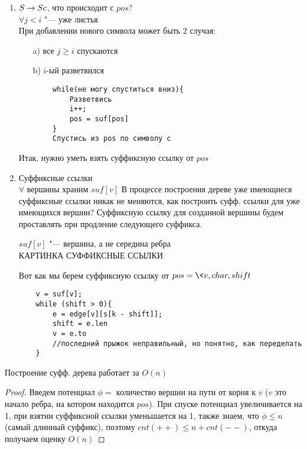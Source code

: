 \begin{enumerate}
\begin{proof}
		КАРТИНКА ДОКАЗАТЕЛЬСТВА ЛЕММЫ
	\end{proof}
	Таким образом, надо поддерживать самый длинный неразретвившийся суффикс, будем хранить его в переменной $pos$, как комбинацию вершины дерева, символа по которому надо пойти и сдвига на ребре ($pos$ может быть на середине ребра), $i$ "--- позиция начала суффикса
\item
	$ S \rightarrow Sc $, что происходит с $pos$? \\
	$\forall j < i$ "--- уже листья \\
	При добавлении нового символа может быть 2 случая:
	\begin{itemize}
	\item[a)]
		все $j \geqslant i$ спускаются
	\item[b)]
		$i$-ый разветвился
	\end{itemize}
	\begin{verbatim}
		while(не могу спуститься вниз){
			Разветвись
			i++;
			pos = suf[pos]
		}
		Спустись из pos по символу c
	\end{verbatim}
	Итак, нужно уметь взять суффиксную ссылку от $pos$
\item
	Суффиксные ссылки \\
	$\forall$ вершины храним $suf[v]$
	В процессе построения дереве уже имеющиеся суффиксные ссылки никак не меняются, как построить суфф. ссылки для уже имеющихся вершин? Суффиксную ссылку для созданной вершины будем проставлять при продление следующего суффикса.
	\begin{lemma}
		$suf[v]$ "--- вершина, а не середина ребра \\
		КАРТИНКА СУФФИКСНЫЕ ССЫЛКИ
	\end{lemma}
	Вот как мы берем суффиксную ссылку от $pos = \<v, char, shift\>$
	\begin{verbatim}
	v = suf[v];
	while (shift > 0){
		e = edge[v][s[k - shift]];
		shift = e.len
		v = e.to
		//последний прыжок неправильный, но понятно, как переделать
	}
	\end{verbatim}
\end{enumerate}

\begin{theorem}
	Построение суфф. дерева работает за $O(n)$
\end{theorem}
\begin{proof}
	Введем потенциал $\phi =$ количество вершин на пути от корня к $v$ ($v$ это начало ребра, на котором находится $pos$). При спуске потенциал увеличивается на 1, при взятии суффиксной ссылки уменьшается на 1, также знаем, что $\phi \leqslant n$ (самый длинный суффикс), поэтому $cnt(++) \leqslant n + cnt(--)$, откуда получаем оценку $O(n)$
\end{proof}

